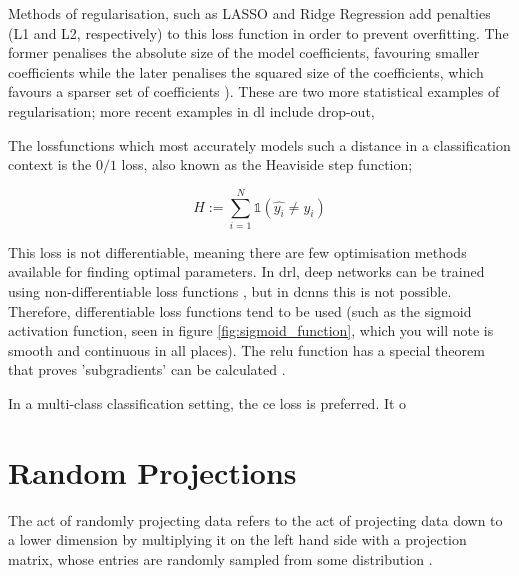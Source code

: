 
Methods of regularisation, such as LASSO and Ridge Regression add penalties (L1 and L2, respectively) to this loss function in order to prevent overfitting. The former penalises the absolute size of the model coefficients,  favouring smaller coefficients while the later penalises the squared size of the coefficients, which favours a sparser set of coefficients \cite{ridge_lasso}). These are two more statistical examples of regularisation; more recent examples in \gls{dl} include drop-out,  %
\bigskip

The \gls{lossfunction}s which most accurately models such a distance in a classification context is the $0/1$ loss, also known as the Heaviside step function;

\begin{equation}
H := \sum_{i = 1}^N \mathds{1} (\hat{y_i} \neq y_i)  
\end{equation}

This loss is not differentiable, meaning there are few optimisation methods available for finding optimal parameters. In \gls{drl}, deep networks can be trained using non-differentiable loss functions \cite{drl_non_differentiable}, but in \gls{dcnn}s this is not possible. Therefore, differentiable loss functions tend to be used (such as the sigmoid activation function, seen in figure \ref{fig:sigmoid_function}, which you will note is smooth and continuous in all places). The \gls{relu} function has a special theorem that proves 'subgradients' can be calculated \cite{subgradient_theorem}.
\bigskip

In a multi-class classification setting, the \gls{ce} loss is preferred. It o

%
%
%

\section{Random Projections}

The act of randomly projecting data refers to the act of projecting data down to a lower dimension by multiplying it on the left hand side with a projection matrix, whose entries are randomly sampled from some distribution \cite{bob_learning_high_dim}.

